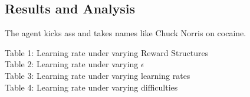 \documentclass{article}
\begin{document}
\begin{multicols}{2}
\section{Results and Analysis}

The agent kicks ass and takes names like Chuck Norris on cocaine.

\begin{description}
    \item[Table 1: Learning rate under varying Reward Structures]
    \item[Table 2: Learning rate under varying $\epsilon$]
    \item[Table 3: Learning rate under varying learning rates]
    \item[Table 4: Learning rate under varying difficulties]
\end{description}



\end{multicols}
\end{document}

